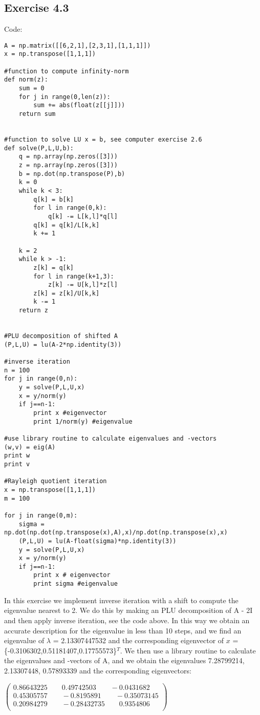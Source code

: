 \documentclass[10pt,a4paper]{article}
\begin{document}
\subsection*{Exercise 4.3}
Code:
\begin{lstlisting}
A = np.matrix([[6,2,1],[2,3,1],[1,1,1]])
x = np.transpose([1,1,1])

#function to compute infinity-norm
def norm(z):
    sum = 0
    for j in range(0,len(z)):
        sum += abs(float(z[[j]]))
    return sum


#function to solve LU x = b, see computer exercise 2.6
def solve(P,L,U,b):
    q = np.array(np.zeros([3]))  
    z = np.array(np.zeros([3]))
    b = np.dot(np.transpose(P),b)
    k = 0
    while k < 3:
        q[k] = b[k]
        for l in range(0,k):
            q[k] -= L[k,l]*q[l]
        q[k] = q[k]/L[k,k]
        k += 1

    k = 2
    while k > -1:
        z[k] = q[k]
        for l in range(k+1,3):
            z[k] -= U[k,l]*z[l]
        z[k] = z[k]/U[k,k]
        k -= 1
    return z
    

#PLU decomposition of shifted A
(P,L,U) = lu(A-2*np.identity(3))

#inverse iteration
n = 100
for j in range(0,n):
    y = solve(P,L,U,x)
    x = y/norm(y)
    if j==n-1:
        print x #eigenvector
        print 1/norm(y) #eigenvalue

#use library routine to calculate eigenvalues and -vectors
(w,v) = eig(A)
print w
print v

#Rayleigh quotient iteration
x = np.transpose([1,1,1])
m = 100

for j in range(0,m):
    sigma = np.dot(np.dot(np.transpose(x),A),x)/np.dot(np.transpose(x),x)
    (P,L,U) = lu(A-float(sigma)*np.identity(3))
    y = solve(P,L,U,x)
    x = y/norm(y)
    if j==n-1:
        print x # eigenvector
        print sigma #eigenvalue
\end{lstlisting}

\noindent In this exercise we implement inverse iteration with a shift to compute the eigenvalue nearest to 2. We do this by making an PLU decomposition of A - 2I and then apply inverse iteration, see the code above. In this way we obtain an accurate description for the eigenvalue in less than 10 steps, and we find an eigenvalue of $\lambda$ = 2.13307447532 and the corresponding eigenvector of $x$ = \{-0.3106302,0.51181407,0.17755573\}$^T$. We then use a library routine to calculate the eigenvalues and -vectors of A, and we obtain the eigenvalues 7.28799214, 2.13307448, 0.57893339 and the corresponding eigenvectors:\\
\begin{center}
$
\begin{pmatrix}
0.86643225\qquad   0.49742503\qquad  -0.0431682\\
0.45305757\qquad   -0.8195891\qquad  -0.35073145\\
0.20984279\qquad   -0.28432735\qquad  0.9354806\\
\end{pmatrix}
$
\end{center}
\end{document}
